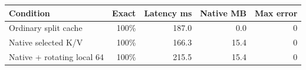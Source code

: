 \begin{tabular}{lrrrr}
\toprule
Condition & Exact & Latency ms & Native MB & Max error \\
\midrule
Ordinary split cache & 100\% & 187.0 & 0.0 & 0 \\
Native selected K/V & 100\% & 166.3 & 15.4 & 0 \\
Native + rotating local 64 & 100\% & 215.5 & 15.4 & 0 \\
\bottomrule
\end{tabular}
